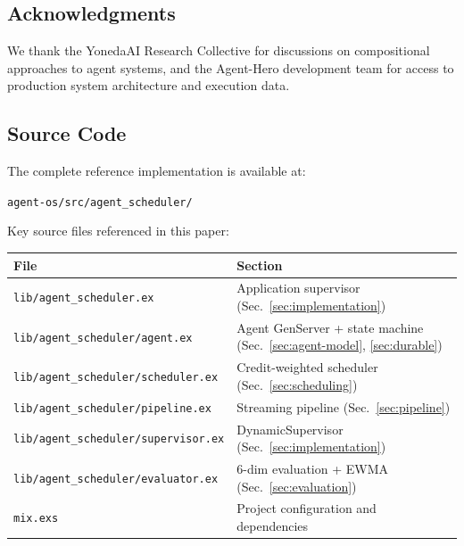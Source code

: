 \documentclass[12pt,a4paper]{article}
\theoremstyle{definition}
\theoremstyle{remark}
\begin{document}
\subsection*{Acknowledgments}

We thank the YonedaAI Research Collective for discussions on compositional approaches to agent systems, and the Agent-Hero development team for access to production system architecture and execution data.

\subsection*{Source Code}

The complete reference implementation is available at:

\begin{center}
\texttt{agent-os/src/agent\_scheduler/}
\end{center}

\noindent Key source files referenced in this paper:

\begin{table}[H]
\centering
\small
\begin{tabular}{@{}ll@{}}
\toprule
\textbf{File} & \textbf{Section} \\
\midrule
\texttt{lib/agent\_scheduler.ex} & Application supervisor (Sec.~\ref{sec:implementation}) \\
\texttt{lib/agent\_scheduler/agent.ex} & Agent GenServer + state machine (Sec.~\ref{sec:agent-model}, \ref{sec:durable}) \\
\texttt{lib/agent\_scheduler/scheduler.ex} & Credit-weighted scheduler (Sec.~\ref{sec:scheduling}) \\
\texttt{lib/agent\_scheduler/pipeline.ex} & Streaming pipeline (Sec.~\ref{sec:pipeline}) \\
\texttt{lib/agent\_scheduler/supervisor.ex} & DynamicSupervisor (Sec.~\ref{sec:implementation}) \\
\texttt{lib/agent\_scheduler/evaluator.ex} & 6-dim evaluation + EWMA (Sec.~\ref{sec:evaluation}) \\
\texttt{mix.exs} & Project configuration and dependencies \\
\bottomrule
\end{tabular}
\end{table}


\end{document}
